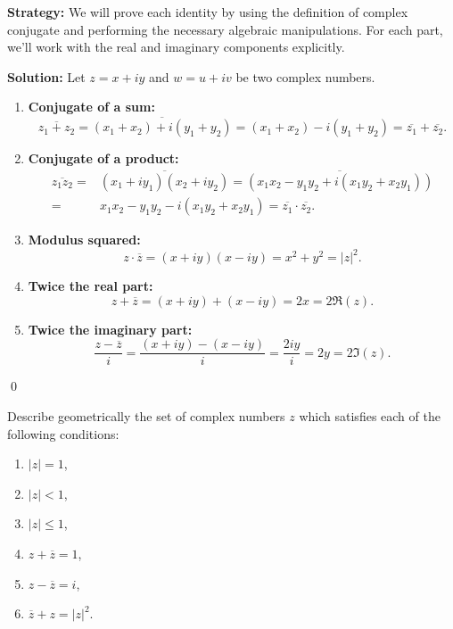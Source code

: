 \noindent\textbf{Strategy:} We will prove each identity by using the definition of complex conjugate and performing the necessary algebraic manipulations. For each part, we'll work with the real and imaginary components explicitly.

\bigskip\noindent\textbf{Solution:}
Let \( z = x + iy \) and \( w = u + iv \) be two complex numbers.

\begin{enumerate}[label=\alph*)]

\item \textbf{Conjugate of a sum:}
\[
\overline{z_1 + z_2} = \overline{(x_1 + x_2) + i(y_1 + y_2)} = (x_1 + x_2) - i(y_1 + y_2) = \overline{z_1} + \overline{z_2}.
\]

\item \textbf{Conjugate of a product:}
\begin{align*}
\overline{z_1 z_2} =& \overline{(x_1 + iy_1)(x_2 + iy_2)} = \overline{(x_1 x_2 - y_1 y_2 + i(x_1 y_2 + x_2 y_1))} \\
=& x_1 x_2 - y_1 y_2 - i(x_1 y_2 + x_2 y_1) = \overline{z_1} \cdot \overline{z_2}.
\end{align*}
\item \textbf{Modulus squared:}
\[
z \cdot \overline{z} = (x + iy)(x - iy) = x^2 + y^2 = |z|^2.
\]

\item \textbf{Twice the real part:}
\[
z + \overline{z} = (x + iy) + (x - iy) = 2x = 2 \Re(z).
\]

\item \textbf{Twice the imaginary part:}
\[
\frac{z - \overline{z}}{i} = \frac{(x + iy) - (x - iy)}{i} = \frac{2iy}{i} = 2y = 2 \Im(z).
\]

\end{enumerate}\qed


\begin{problembox}
\begin{problemstatement}
Describe geometrically the set of complex numbers \( z \) which satisfies each of the following conditions:
\begin{enumerate}[label=\alph*)]
\item \( |z| = 1 \),
\item \( |z| < 1 \),
\item \( |z| \leq 1 \),
\item \( z + \overline{z} = 1 \),
\item \( z - \overline{z} = i \),
\item \( \overline{z} + z = |z|^2 \).
\end{enumerate}
\end{problemstatement}
\end{problembox}

